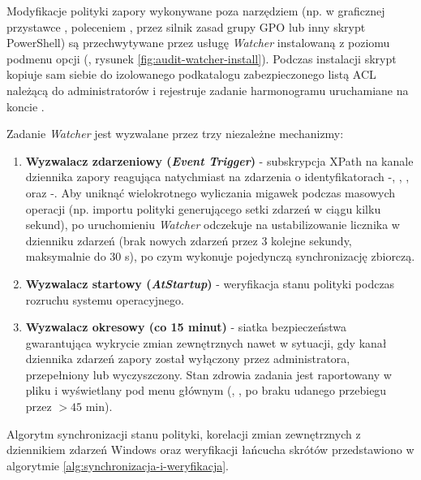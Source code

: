Modyfikacje polityki zapory wykonywane poza narzędziem (np. w graficznej przystawce , poleceniem , przez silnik zasad grupy GPO lub inny skrypt PowerShell) są przechwytywane przez usługę \textit{Watcher} instalowaną z poziomu podmenu opcji  (, rysunek \ref{fig:audit-watcher-install}). Podczas instalacji skrypt kopiuje sam siebie do izolowanego podkatalogu  zabezpieczonego listą ACL należącą do administratorów i rejestruje zadanie harmonogramu \code{\FirewallAudit\Watcher} uruchamiane na koncie .

Zadanie \textit{Watcher} jest wyzwalane przez trzy niezależne mechanizmy:
\begin{enumerate}
    \item \textbf{Wyzwalacz zdarzeniowy (\textit{Event Trigger})} - subskrypcja XPath na kanale dziennika zapory reagująca natychmiast na zdarzenia o identyfikatorach -, , ,  oraz -. Aby uniknąć wielokrotnego wyliczania migawek podczas masowych operacji (np. importu polityki generującego setki zdarzeń w ciągu kilku sekund), po uruchomieniu \textit{Watcher} odczekuje na ustabilizowanie licznika  w dzienniku zdarzeń (brak nowych zdarzeń przez 3 kolejne sekundy, maksymalnie do 30 s), po czym wykonuje pojedynczą synchronizację zbiorczą.
    \item \textbf{Wyzwalacz startowy (\textit{AtStartup})} - weryfikacja stanu polityki podczas rozruchu systemu operacyjnego.
    \item \textbf{Wyzwalacz okresowy (co 15 minut)} - siatka bezpieczeństwa gwarantująca wykrycie zmian zewnętrznych nawet w sytuacji, gdy kanał dziennika zdarzeń zapory został wyłączony przez administratora, przepełniony lub wyczyszczony. Stan zdrowia zadania jest raportowany w pliku  i wyświetlany pod menu głównym (, ,  po braku udanego przebiegu przez $>45$ min).
\end{enumerate}


Algorytm synchronizacji stanu polityki, korelacji zmian zewnętrznych z dziennikiem zdarzeń Windows oraz weryfikacji łańcucha skrótów przedstawiono w algorytmie \ref{alg:synchronizacja-i-weryfikacja}.

